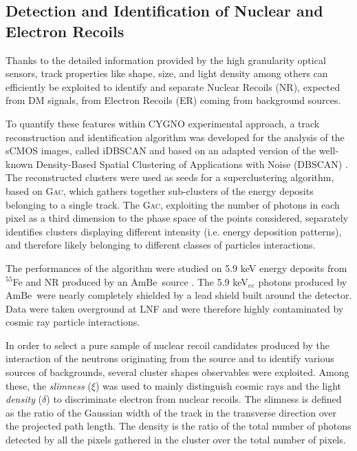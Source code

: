 \documentclass[physics,article,submit,moreauthors,pdftex]{Definitions/mdpi}
\newcommand{\ambe}{\ensuremath{\textrm{Am} \textrm{Be}}\xspace}
\newcommand{\gac}{{\textsc{Gac}}\xspace}
\begin{document}
\subsection{Detection and Identification of Nuclear and Electron Recoils}
\label{sect:rej}

Thanks to the detailed information provided by the high granularity optical sensors, track properties like shape, size, and light density among others can efficiently be exploited to identify and separate Nuclear Recoils (NR), expected from DM signals, from Electron Recoils (ER) coming from background sources.

To quantify these features within CYGNO experimental approach, a track reconstruction and identification algorithm was developed for the analysis of the sCMOS images, called iDBSCAN \cite{Baracchini:2020iwg} and based on an adapted version of the well-known Density-Based Spatial Clustering of Applications with Noise (DBSCAN) \cite{dbscan1996}. The reconstructed clusters were used as seeds for a superclustering algorithm, based on \gac \cite{gac,mgac}, which gathers together sub-clusters of the energy deposits belonging to a single track. The \gac, exploiting the number of photons in each pixel as a third dimension to the phase space of the points considered, separately identifies clusters displaying different intensity (i.e. energy deposition patterns), and therefore likely belonging to different classes of particles interactions.

The performances of the algorithm were studied on 5.9 keV energy deposits from $^{55}$Fe and NR  produced by an \ambe~source \cite{bib:coronello}. The 5.9 keV$_{ee}$ photons produced by \ambe~were nearly completely shielded by a lead shield built around the detector. Data were taken overground at LNF and were therefore highly contaminated by cosmic ray particle interactions.


In order to  select a pure sample of nuclear recoil candidates produced by the interaction of the neutrons
originating from the source and to identify various sources of backgrounds, several cluster shapes observables were exploited. Among these, the \emph{slimness} ($\xi$) was used to mainly distinguish cosmic rays  and the light \emph{density} ($\delta$) to discriminate electron from nuclear recoils. The slimness is defined as the ratio of the Gaussian width of the track in the transverse direction over the projected path length. The density is the ratio of the total number of photons detected by all the pixels gathered in the cluster over the total number of pixels. 
\end{document}

